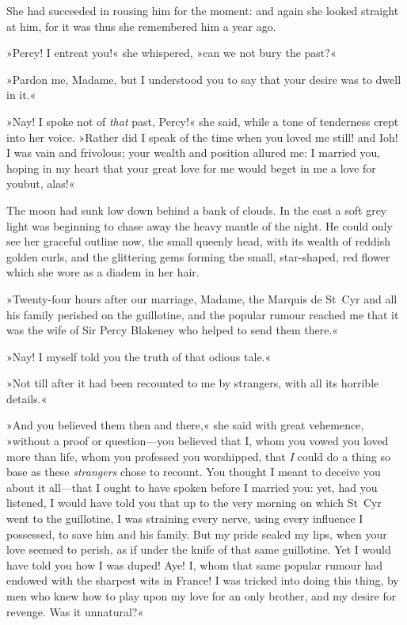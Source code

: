 She had succeeded in rousing him for the moment: and again she looked straight at him, for it was thus she remembered him a year ago.

»Percy! I entreat you!« she whispered, »can we not bury the past?«

»Pardon me, Madame, but I understood you to say that your desire was to dwell in it.«

»Nay! I spoke not of \textit{that} past, Percy!« she said, while a tone of tenderness crept into her voice. »Rather did I speak of the time when you loved me still! and I\textellipsis \allowbreak  oh! I was vain and frivolous; your wealth and position allured me: I married you, hoping in my heart that your great love for me would beget in me a love for you\textellipsis \allowbreak  but, alas!\textellipsis«

The moon had sunk low down behind a bank of clouds. In the east a soft grey light was beginning to chase away the heavy mantle of the night. He could only see her graceful outline now, the small queenly head, with its wealth of reddish golden curls, and the glittering gems forming the small, star-shaped, red flower which she wore as a diadem in her hair.

»Twenty-four hours after our marriage, Madame, the Marquis de St~Cyr and all his family perished on the guillotine, and the popular rumour reached me that it was the wife of Sir Percy Blakeney who helped to send them there.«

»Nay! I myself told you the truth of that odious tale.«

»Not till after it had been recounted to me by strangers, with all its horrible details.«

»And you believed them then and there,« she said with great vehemence, »without a proof or question—you believed that I, whom you vowed you loved more than life, whom you professed you worshipped, that \textit{I} could do a thing so base as these \textit{strangers} chose to recount. You thought I meant to deceive you about it all—that I ought to have spoken before I married you: yet, had you listened, I would have told you that up to the very morning on which St~Cyr went to the guillotine, I was straining every nerve, using every influence I possessed, to save him and his family. But my pride sealed my lips, when your love seemed to perish, as if under the knife of that same guillotine. Yet I would have told you how I was duped! Aye! I, whom that same popular rumour had endowed with the sharpest wits in France! I was tricked into doing this thing, by men who knew how to play upon my love for an only brother, and my desire for revenge. Was it unnatural?«

